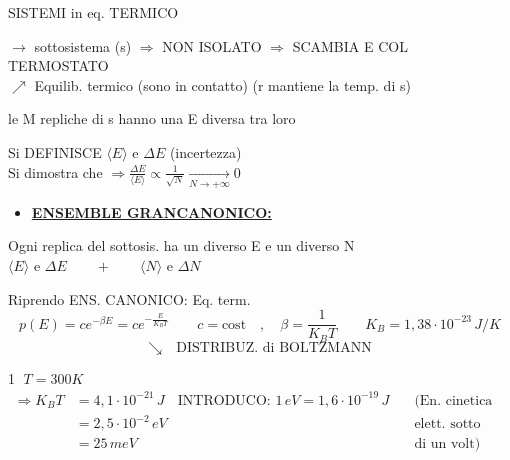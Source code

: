 \documentclass[12pt,a4paper]{article}
\begin{document}
SISTEMI in eq. TERMICO


$\rightarrow$ sottosistema (s) $\Rightarrow$ NON ISOLATO $\Rightarrow$ SCAMBIA E COL TERMOSTATO \\
$\nearrow$ Equilib. termico (sono in contatto) (r mantiene la temp. di s)

\vspace{0.3cm}
le M repliche di s hanno una E diversa tra loro

\vspace{0.5cm}
Si DEFINISCE $\langle E \rangle$ e $\Delta E$ (incertezza) \\
Si dimostra che $\Rightarrow \frac{\Delta E}{\langle E \rangle} \propto \frac{1}{\sqrt{N}} \xrightarrow[N \to +\infty]{} 0$

\vspace{0.8cm}
\begin{itemize}
    \item \underline{\textbf{ENSEMBLE GRANCANONICO:}}
\end{itemize}


Ogni replica del sottosis. ha un diverso E e un diverso N \\
$\langle E \rangle$ e $\Delta E \qquad + \qquad \langle N \rangle$ e $\Delta N$

\vspace{0.8cm}
\noindent Riprendo ENS. CANONICO: Eq. term.
\begin{equation*}
    p(E) = c e^{-\beta E} = c e^{-\frac{E}{K_B T}} \qquad c = \text{cost} \quad , \quad \beta = \frac{1}{K_B T} \qquad K_B = 1,38 \cdot 10^{-23} \, J/K
\end{equation*}
\begin{equation*}
    \searrow \quad \text{DISTRIBUZ. di BOLTZMANN}
\end{equation*}

\vspace{0.3cm}
\noindent \textcircled{1} $T = 300K$
\begin{align*}
    \Rightarrow K_B T &= 4,1 \cdot 10^{-21} \, J & \text{INTRODUCO: } 1 \, eV = 1,6 \cdot 10^{-19} \, J \quad & \text{(En. cinetica di un} \\
    &= 2,5 \cdot 10^{-2} \, eV & & \text{elett. sotto diff. pot.} \\
    &= 25 \, meV & & \text{di un volt)}
\end{align*}
\end{document}
